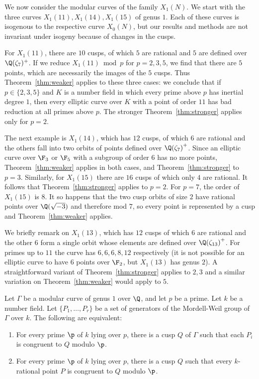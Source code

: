 \documentclass[12pt]{amsart}
\newcommand{\adam}[1]{{\textbf{Adam}: {\textcolor{blue}{#1}}}}
\begin{document}
\begin{exm}\label{ex:x1}
We now consider the modular curves of the family $X_1(N)$.  We start with the
three curves $X_1(11), X_1(14), X_1(15)$ of genus $1$.  Each of these curves is
isogenous to the respective curve $X_0(N)$, but our results and methods are not
invariant under isogeny because of changes in the cusps.

For $X_1(11)$, there are $10$ cusps, of which $5$ are rational and $5$ are defined
over $\Q(\zeta_7)^+$.  If we reduce $X_1(11) \bmod p$ for $p = 2, 3, 5$, we find
that there are $5$ points, which are necessarily the images of the $5$ cusps.  
Thus Theorem~\ref{thm:weaker} applies to these three cases: we conclude that if
$p \in \{2,3,5\}$ and $K$ is a number field in which every prime above $p$ has
inertial degree $1$, then every elliptic curve over $K$ with a point of order $11$
has bad reduction at all primes above $p$.  The stronger Theorem~\ref{thm:stronger}
applies only for $p = 2$.

The next example is $X_1(14)$, which has $12$ cusps, of which $6$ are rational
and the others fall into two orbits of points defined over ${\Q(\zeta_7)}^+$.
Since an elliptic curve over $\F_3$ or $\F_5$ with a subgroup of order $6$ has no
more points, Theorem~\ref{thm:weaker} applies in both cases, and 
Theorem~\ref{thm:stronger} to $p = 3$.  Similarly, for $X_1(15)$ there are $16$
cusps of which only $4$ are rational.  It follows that Theorem~\ref{thm:stronger}
applies to $p = 2$.  For $p = 7$,  the order of $X_1(15)$ is $8$.  It so happens
that the two cusp orbits of size $2$ have rational points over $\Q(\sqrt{-3})$ and
therefore mod $7$, so every point is represented by a cusp and Theorem~\ref{thm:weaker}
applies.

We briefly remark on $X_1(13)$, which has $12$ cusps of which $6$ are rational and
the other $6$ form a single orbit whose elements are defined over ${\Q(\zeta_{13})}^+$.
For primes up to $11$ the curve has $6, 6, 6, 8, 12$ respectively (it is not possible
for an elliptic curve to have $6$ points over $\F_2$, but $X_1(13)$ has genus $2$).
A straightforward variant of Theorem~\ref{thm:stronger} applies to $2, 3$ and a similar variation on Theorem~\ref{thm:weaker} would apply to $5$.  %
\end{exm}
\begin{thm}\label{mostgeneral}
    Let $\Gamma$ be a modular curve of genus $1$ over $\Q$, and let $p$ be a prime.  Let $k$ be a number field.  Let $\{P_1,\ldots,P_r\}$ be a set of generators of the Mordell-Weil group of $\Gamma$ over $k$.  The following are equivalent:
    \begin{enumerate}
        \item For every prime $\p$ of $k$ lying over $p$, there is a cusp $Q$ of $\Gamma$ such that each $P_i$ is congruent to $Q$ modulo $\p$.
        \item For every prime $\p$ of $k$ lying over $p$, there is a cusp $Q$ such that every $k$-rational point $P$ is congruent to $Q$ modulo $\p$.
    \end{enumerate}
\end{thm}
\end{document}
